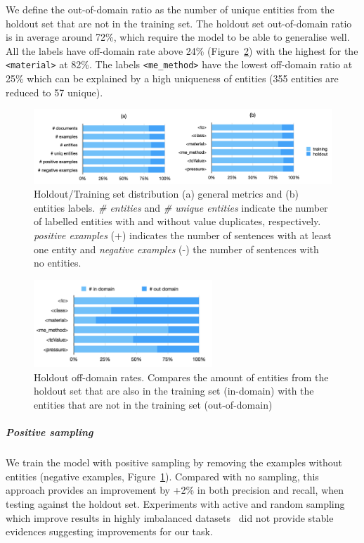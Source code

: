 \documentclass{article}
\begin{document}
We define the out-of-domain ratio as the number of unique entities from the holdout set that are not in the training set. 
The holdout set out-of-domain ratio is in average around 72\%, which require the model to be able to generalise well. 
All the labels have off-domain rate above 24\%  (Figure~\ref{fig:out-domain-holdout}) with the highest for the \texttt{<material>} at 82\%. The labels \texttt{<me\_method>} have the lowest off-domain ratio at 25\% which can be explained by a high uniqueness of entities (355 entities are reduced to 57 unique). 

\begin{figure}[ht]
\centering
\includegraphics[width=\textwidth]{holdout-training-set}
\caption{Holdout/Training set distribution (a) general metrics and (b) entities labels.
\textit{\# entities} and \textit{\# unique entities} indicate the number of labelled entities with and without value duplicates, respectively. \textit{positive examples} (+) indicates the number of sentences with at least one entity and \textit{negative examples} (-) the number of sentences with no entities.}
\label{fig:training-holdout-set-distribution}
\end{figure}

\begin{figure}[ht]
\centering
\includegraphics[width=0.6\textwidth]{out-domain-holdout-unique}
\caption{Holdout off-domain rates. Compares the amount of entities from the holdout set that are also in the training set (in-domain) with the entities that are not in the training set (out-of-domain)}
\label{fig:out-domain-holdout}
\end{figure}

\subparagraph{Positive sampling} 
We train the model with positive sampling by removing the examples without entities (negative examples, Figure~\ref{fig:training-holdout-set-distribution}). 
Compared with no sampling, this approach provides an improvement by +2\% in both precision and recall, when testing against the holdout set. 
Experiments with active and random sampling which improve results in highly imbalanced datasets~\cite{lopez2021mining} did not provide stable evidences suggesting improvements for our task. 
\end{document}
